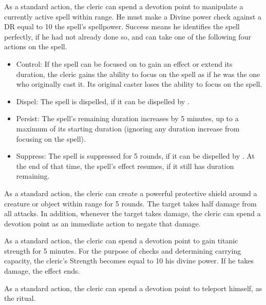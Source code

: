             As a standard action, the cleric can spend a devotion point to manipulate a currently active spell within \rngmed range.
            He must make a Divine power check against a DR equal to 10 \add the spell's spellpower.
            Success means he identifies the spell perfectly, if he had not already done so, and can take one of the following four actions on the spell.
            \begin{itemize}
                \item Control: If the spell can be focused on to gain an effect or extend its duration, the cleric gains the ability to focus on the spell as if he was the one who originally cast it.
                    Its original caster loses the ability to focus on the spell.
                \item Dispel: The spell is dispelled, if it can be dispelled by .
                \item Persist: The spell's remaining duration increases by 5 minutes, up to a maximum of its starting duration (ignoring any duration increase from focusing on the spell).
                \item Suppress: The spell is suppressed for 5 rounds, if it can be dispelled by .
                    At the end of that time, the spell's effect resumes, if it still has duration remaining.
            \end{itemize}

            As a standard action, the cleric can create a powerful protective shield around a creature or object within \rngclose range for 5 rounds.
            The target takes half damage from all attacks.
            In addition, whenever the target takes damage, the cleric can spend a devotion point as an immediate action to negate that damage.

            As a standard action, the cleric can spend a devotion point to gain titanic strength for 5 minutes.
            For the purpose of checks and determining carrying capacity, the cleric's Strength becomes equal to 10 \add his divine power.
            If he takes damage, the effect ends.

            As a standard action, the cleric can spend a devotion point to teleport himself, as the  ritual.

